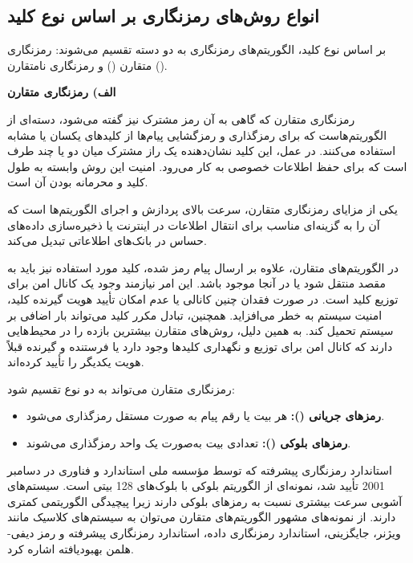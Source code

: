 \subsection{انواع روش‌های رمزنگاری بر اساس نوع کلید}
بر اساس نوع کلید، الگوریتم‌های رمزنگاری به دو دسته تقسیم می‌شوند: رمزنگاری متقارن () و رمزنگاری نامتقارن ()\cite{ref25}.

\textbf{الف) رمزنگاری متقارن}

رمزنگاری متقارن که گاهی به آن رمز مشترک نیز گفته می‌شود، دسته‌ای از الگوریتم‌هاست که برای رمزگذاری و رمزگشایی پیام‌ها از کلیدهای یکسان یا مشابه استفاده می‌کنند. در عمل، این کلید نشان‌دهنده یک راز مشترک میان دو یا چند طرف است که برای حفظ اطلاعات خصوصی به کار می‌رود. امنیت این روش وابسته به طول کلید و محرمانه بودن آن است.

یکی از مزایای رمزنگاری متقارن، سرعت بالای پردازش و اجرای الگوریتم‌ها است که آن را به گزینه‌ای مناسب برای انتقال اطلاعات در اینترنت یا ذخیره‌سازی داده‌های حساس در بانک‌های اطلاعاتی تبدیل می‌کند\cite{ref26}.

در الگوریتم‌های متقارن، علاوه بر ارسال پیام رمز شده، کلید مورد استفاده نیز باید به مقصد منتقل شود یا در آنجا موجود باشد. این امر نیازمند وجود یک کانال امن برای توزیع کلید است. در صورت فقدان چنین کانالی یا عدم امکان تأیید هویت گیرنده کلید، امنیت سیستم به خطر می‌افزاید. همچنین، تبادل مکرر کلید می‌تواند بار اضافی بر سیستم تحمیل کند. به همین دلیل، روش‌های متقارن بیشترین بازده را در محیط‌هایی دارند که کانال امن برای توزیع و نگهداری کلیدها وجود دارد یا فرستنده و گیرنده قبلاً هویت یکدیگر را تأیید کرده‌اند.

رمزنگاری متقارن می‌تواند به دو نوع تقسیم شود:
\begin{itemize}
    \item \textbf{رمزهای جریانی ():} هر بیت یا رقم پیام به صورت مستقل رمزگذاری می‌شود.
    \item \textbf{رمزهای بلوکی ():} تعدادی بیت به‌صورت یک واحد رمزگذاری می‌شوند.
\end{itemize}

استاندارد رمزنگاری پیشرفته که توسط مؤسسه ملی استاندارد و فناوری\protect{} در دسامبر 2001 تأیید شد، نمونه‌ای از الگوریتم بلوکی با بلوک‌های 128 بیتی است. سیستم‌های آشوبی سرعت بیشتری نسبت به رمزهای بلوکی دارند زیرا پیچیدگی الگوریتمی کمتری دارند. از نمونه‌های مشهور الگوریتم‌های متقارن می‌توان به سیستم‌های کلاسیک مانند ویژنر\protect{}، جایگزینی، استاندارد رمزنگاری داده\protect{}، استاندارد رمزنگاری پیشرفته و رمز دیفی-هلمن بهبودیافته\protect{} اشاره کرد\cite{ref25, ref27}.

